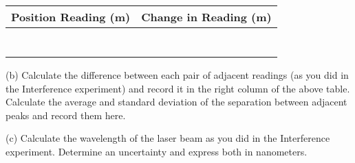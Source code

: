 \vspace{0.3cm}
{\centering \begin{tabular}{|c|c|}
\hline
Position Reading (m)&
Change in Reading (m)\\
\hline
\hline
&
\\
\hline
&
\\
\hline
&
\\
\hline
&
\\
\hline
&
\\
\hline
&
\\
\hline
&
\\
\hline
\end{tabular}\par}
\vspace{0.3cm}

(b) Calculate the difference between each pair of adjacent readings (as you did 
in the Interference experiment) and record it in the right column of the above 
table. Calculate the average and standard deviation of the separation between 
adjacent peaks and record them here.
\vspace{20mm}

(c) Calculate the wavelength of the laser beam as you did in the Interference 
experiment. Determine an uncertainty and express both in nanometers.






